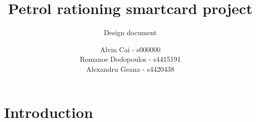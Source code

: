 \documentclass[a4paper,10pt]{llncs}
\title{Petrol rationing smartcard project}
\subtitle{Design document}
\author{Alvin Cai - s000000 \\ Romanos Dodopoulos - s4415191 \\ Alexandru Geana - s4420438}
\institute{}
\begin{document}
\maketitle

\section{Introduction}
\end{document}
